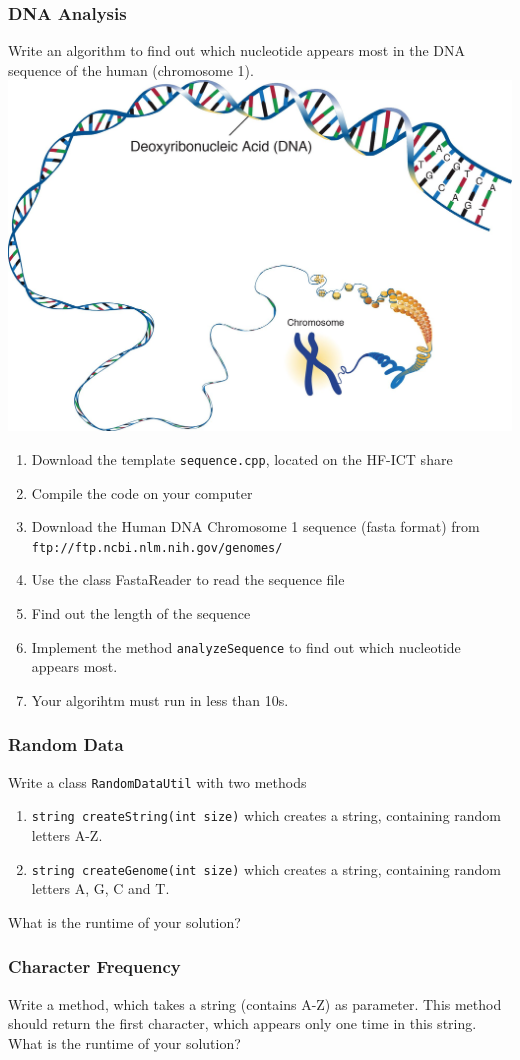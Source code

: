 \begin{frame}[fragile]
\frametitle{DNA Analysis}
{\tiny
\begin{exercise}
Write an algorithm to find out which nucleotide appears most in the DNA
sequence of the human (chromosome 1).\\
\includegraphics[scale=0.3]{img/dna.jpg}
\begin{enumerate}
\item Download the template \verb|sequence.cpp|, located on the HF-ICT share
\item Compile the code on your computer
\item Download the Human DNA Chromosome 1 sequence (fasta format) from
\verb|ftp://ftp.ncbi.nlm.nih.gov/genomes/|
\item Use the class FastaReader to read the sequence file
\item Find out the length of the sequence
\item Implement the method \verb|analyzeSequence| to find out which nucleotide
appears most.
\item Your algorihtm must run in less than 10s.
\end{enumerate}

\end{exercise}
}

\end{frame}

\begin{frame}[fragile]
\frametitle{Random Data}
\begin{exercise}
Write a class \verb|RandomDataUtil| with two methods
\begin{enumerate}
\item \verb|string createString(int size)| which creates a string, containing
random letters A-Z.
\item \verb|string createGenome(int size)| which creates a string, containing
random letters A, G, C and T.
\end{enumerate}
What is the runtime of your solution?
\end{exercise}

\end{frame}

\begin{frame}[fragile]
\frametitle{Character Frequency}
\begin{exercise}
Write a method, which takes a string (contains A-Z) as parameter. This method
should return the first character, which appears only one time
in this string.\\
What is the runtime of your solution?
\end{exercise}

\end{frame}
